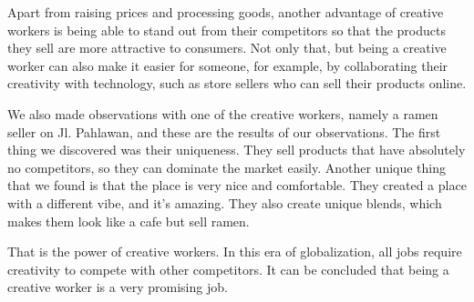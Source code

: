 \documentclass[a4paper, 14pt]{extarticle}
\begin{document}
Apart from raising prices and processing goods, another advantage of creative workers is being able to stand out from their competitors so that the products they sell are more attractive to consumers. Not only that, but being a creative worker can also make it easier for someone, for example, by collaborating their creativity with technology, such as store sellers who can sell their products online.

We also made observations with one of the creative workers, namely a ramen seller on Jl. Pahlawan, and these are the results of our observations. The first thing we discovered was their uniqueness. They sell products that have absolutely no competitors, so they can dominate the market easily. Another unique thing that we found is that the place is very nice and comfortable. They created a place with a different vibe, and it's amazing. They also create unique blends, which makes them look like a cafe but sell ramen.

That is the power of creative workers. In this era of globalization, all jobs require creativity to compete with other competitors. It can be concluded that being a creative worker is a very promising job.
\end{document}
